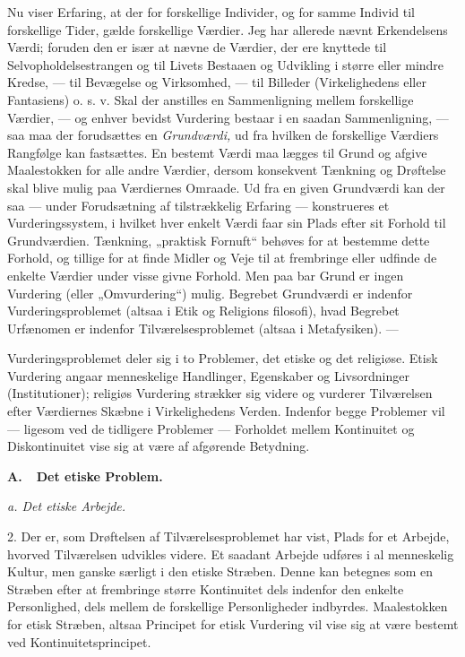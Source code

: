 \documentclass[12pt,a4paper,openany]{book}
\newcommand{\opage}[1]{\marginnote{\footnotesize\textit{[#1]}}}
\begin{document}
Nu viser Erfaring, at der for forskellige Individer, og for samme Individ til
forskellige Tider, gælde forskellige Værdier. Jeg har allerede nævnt
Erkendelsens Værdi; foruden den er især at nævne de Værdier, der ere knyttede
til Selvopholdelsestrangen og til Livets Bestaaen og Udvikling i større eller
mindre Kredse, --- til Bevægelse og Virksomhed, --- til Billeder
(Virkelighedens eller Fantasiens) o. s. v. Skal der anstilles en Sammenligning
mellem forskellige Værdier, --- og enhver bevidst Vurdering bestaar i en saadan
Sammenligning, --- saa maa der forudsættes en \textit{Grundværdi,} ud fra
hvilken de forskellige Værdiers Rangfølge kan fastsættes. En bestemt Værdi maa
lægges til Grund og afgive Maalestokken for alle andre Værdier, dersom
konsekvent Tænkning og Drøftelse skal blive mulig paa Værdiernes Omraade. Ud
fra en given Grundværdi kan der saa --- under Forudsætning af tilstrækkelig
Erfaring --- konstrueres et Vurderingssystem, i hvilket hver enkelt Værdi faar
sin Plads efter sit Forhold til Grundværdien. Tænkning, „praktisk Fornuft“
behøves for at bestemme dette Forhold, og tillige for at finde Midler og Veje
til at frembringe eller udfinde de enkelte Værdier under visse givne Forhold.
Men paa bar Grund er ingen Vurdering (eller „Omvurdering“) mulig. Begrebet
Grundværdi er indenfor Vurderingsproblemet (altsaa i Etik og Religions%
\opage{72}filosofi), hvad Begrebet Urfænomen er indenfor Tilværelsesproblemet
(altsaa i Metafysiken). ---

Vurderingsproblemet deler sig i to Problemer, det etiske og det religiøse.
Etisk Vurdering angaar menneskelige Handlinger, Egenskaber og Livsordninger
(Institutioner); religiøs Vurdering strækker sig videre og vurderer Tilværelsen
efter Værdiernes Skæbne i Virkelighedens Verden. Indenfor begge Problemer vil
--- ligesom ved de tidligere Problemer --- Forholdet mellem Kontinuitet og
Diskontinuitet vise sig at være af afgørende Betydning.

\begin{center}\textbf{\large A.\ \ Det etiske Problem.}\end{center}

\begin{center}\textit{a. Det etiske Arbejde.}\end{center}

2. Der er, som Drøftelsen af Tilværelsesproblemet har vist, Plads for et
Arbejde, hvorved Tilværelsen udvikles videre. Et saadant Arbejde udføres i al
menneskelig Kultur, men ganske særligt i den etiske Stræben. Denne kan betegnes
som en Stræben efter at frembringe større Kontinuitet dels indenfor den enkelte
Personlighed, dels mellem de forskellige Personligheder indbyrdes. Maalestokken
for etisk Stræben, altsaa Principet for etisk Vurdering vil vise sig at være
bestemt ved Kontinuitetsprincipet.
\end{document}
